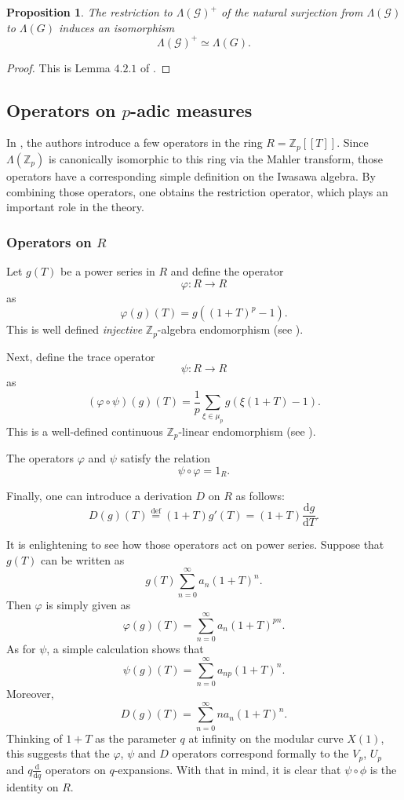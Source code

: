 \documentclass[twoside,10pt]{article}
\newtheorem{prop}{Proposition}
\newcommand{\rarr}{\rightarrow}
\newcommand{\Z}{\mathbb{Z}}
\newcommand{\curlG}{\mathcal{G}}
\newcommand{\eqdef}{\overset{\text{def}}{=}}
\renewcommand{\d}{\text{d}}
\begin{document}
\begin{prop}
	The restriction to $\Lambda(\curlG)^+$ of the natural surjection from $\Lambda(\curlG)$ to $\Lambda(G)$ induces an isomorphism
	\[\Lambda(\curlG)^+\simeq\Lambda(G).\]
\end{prop}
\begin{proof}
	This is Lemma $4.2.1$ of \cite{CS}.
\end{proof}

\subsection{Operators on $p$-adic measures}
In \cite{CS}, the authors introduce a few operators in the ring $R=\Z_p[[T]]$. Since $\Lambda(\Z_p)$ is canonically isomorphic to this ring via the Mahler transform, those operators have a corresponding simple definition on the Iwasawa algebra. By combining those operators, one obtains the restriction operator, which plays an important role in the theory.

\subsubsection*{Operators on $R$}
Let $g(T)$ be a power series in $R$ and define the operator
\[\varphi:R\rarr R\]
as
\[\varphi(g)(T)=g((1+T)^p-1).\]
This is well defined \emph{injective} $\Z_p$-algebra endomorphism (see \cite[Lemma 2.2.2]{CS}).

Next, define the trace operator
\[\psi:R\rarr R\]
as
\[(\varphi\circ\psi)(g)(T)=\frac{1}{p}\sum_{\xi\in\mu_p}g(\xi(1+T)-1).\]
This is a well-defined continuous $\Z_p$-linear endomorphism (see \cite[Proposition 2.2.3]{CS}).

The operators $\varphi$ and $\psi$ satisfy the relation
\[\psi\circ\varphi=1_R.\]

Finally, one can introduce a derivation $D$ on $R$ as follows:
\[D(g)(T)\eqdef(1+T)g'(T)=(1+T)\frac{\d g}{\d T}.\]

It is enlightening to see how those operators act on power series. Suppose that $g(T)$ can be written as
\[g(T)\sum_{n=0}^\infty a_n(1+T)^n.\]
Then $\varphi$ is simply given as
\[\varphi(g)(T)=\sum_{n=0}^\infty a_n(1+T)^{pn}.\]
As for $\psi$, a simple calculation shows that
\[\psi(g)(T)=\sum_{n=0}^\infty a_{np}(1+T)^n.\]
Moreover,
\[D(g)(T)=\sum_{n=0}^\infty na_n(1+T)^n.\]
Thinking of $1+T$ as the parameter $q$ at infinity on the modular curve $X(1)$, this suggests that the $\varphi$, $\psi$ and $D$ operators correspond formally to the $V_p$, $U_p$ and $q\frac{\d}{\d q}$ operators on $q$-expansions. With that in mind, it is clear that $\psi\circ\phi$ is the identity on $R$.
\end{document}
